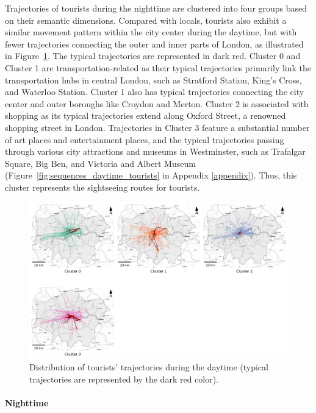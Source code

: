\documentclass{article}
\newcommand{\subsubsubsection}[1]{\paragraph{#1}\mbox{}\\}
\theoremstyle{remark}
\begin{document}
Trajectories of tourists during the nighttime are clustered into four groups based on their semantic dimensions. Compared with locals, tourists also exhibit a similar movement pattern within the city center during the daytime, but with fewer trajectories connecting the outer and inner parts of London, as illustrated in Figure~\ref{fig:traj_distribution_daytime_tourists}. The typical trajectories are represented in dark red. Cluster 0 and Cluster 1 are transportation-related as their typical trajectories primarily link the transportation hubs in central London, such as Stratford Station, King's Cross, and Waterloo Station. Cluster 1 also has typical trajectories connecting the city center and outer boroughs like Croydon and Merton. Cluster 2 is associated with shopping as its typical trajectories extend along Oxford Street, a renowned shopping street in London. Trajectories in Cluster 3 feature a substantial number of art places and entertainment places, and the typical trajectories passing through various city attractions and museums in Westminster, such as Trafalgar Square, Big Ben, and Victoria and Albert Museum (Figure~\ref{fig:sequences_daytime_tourists} in Appendix \ref{appendix}). Thus, this cluster represents the sightseeing routes for tourists.


\begin{figure}[!h]
\centering
\includegraphics[width=1\textwidth]{figures/traj_distribution_daytime_tourists.png}
\caption{\label{fig:traj_distribution_daytime_tourists}Distribution of tourists' trajectories during the daytime (typical trajectories are represented by the dark red color).}
\end{figure}



\subsubsubsection{Nighttime}
\end{document}

